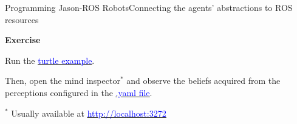 \documentclass[compress]{beamer}
\newcommand{\link}[2]{\href{#1}{\underline{\textcolor{blue}{#2}}}}
\begin{document}
\begin{frame}[fragile]{Programming Jason-ROS Robots}{Connecting the agents' abstractions to ROS resources}

{\bf Exercise}

\vspace{2em}

Run the \link{https://github.com/issia-2026-jason-ros/turtle-example}{turtle example}. \\

\vspace{1em}

Then, open the mind inspector$^*$ and observe the beliefs acquired from the perceptions configured in the \link{https://github.com/issia-2026-jason-ros/turtle-example/blob/master/src/agt/robot1.yaml}{.yaml file}.

\vspace{3em}
\tiny
$^*$ Usually available at \link{http://localhost:3272}{http://localhost:3272}

\end{frame}
\end{document}
